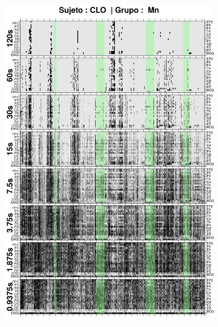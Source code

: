 \begin{figure}
\centering
\includegraphics[width=0.9\linewidth]
{./img_ejemplos/CLMN10SUE_comp_est_.png} 
\end{figure}

